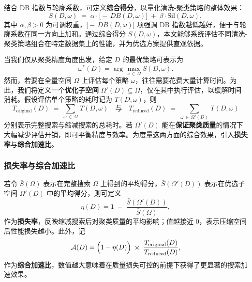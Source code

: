 \documentclass[10pt]{article} %
\numberwithin{equation}{section}
\begin{document}
结合 DB 指数与轮廓系数，可定义\textbf{综合得分}，以量化清洗-聚类策略的整体效果：
\begin{equation}\label{eq:S-score}
  S(D,\omega)
  \;=\;
  \alpha \cdot \bigl[-\,DB(D,\omega)\bigr]
  \;+\;
  \beta \cdot \mathrm{Sil}(D,\omega),
\end{equation}
其中 \(\alpha,\beta > 0\) 为可调权重，\(\bigl[-\,DB(D,\omega)\bigr]\) 项强调 DB 指数越低越好，便于与轮廓系数在同一方向上加和。通过综合得分 \(S(D,\omega)\)，本文能够系统评估不同清洗-聚类策略组合在特定数据集上的性能，并为优选方案提供直观依据。

当我们仅从聚类精度角度出发，给定 \(D\) 的最优策略可表示为
\begin{equation}\label{eq:best strategy}
  \omega^*(D)
  = \arg\max_{\omega \,\in\, \Omega} S(D,\omega).
\end{equation}
然而，若要在全量空间 \(\Omega\) 上评估每个策略 \(\omega\)，往往需要花费大量计算时间。为此，我们将定义一个\textbf{优化子空间} \(\Omega'(D)\subseteq \Omega\)，仅在其中执行评估，以缓解时间消耗。假设评估单个策略的耗时记为 \(T(D,\omega)\)，则
\begin{equation}\label{eq:T-original}
  T_{\text{original}}(D)
  \;=\;
  \sum_{\omega \,\in\, \Omega} \, T(D,\omega)
\quad\text{与}\quad
  T_{\text{reduced}}(D)
  \;=\;
  \sum_{\omega \,\in\, \Omega'(D)} \, T(D,\omega)
\end{equation}
分别表示完整搜索与缩减搜索的总耗时。若 \(\Omega'(D)\) 能在\textbf{保证聚类质量}的情况下大幅减少评估开销，即可平衡精度与效率。为度量这两方面的综合效果，引入\textbf{损失率}与\textbf{综合加速比}。

\subsubsection*{损失率与综合加速比}
若令 \(\bar{S}(\Omega)\) 表示在完整搜索 \(\Omega\) 上得到的平均得分，\(\bar{S}(\Omega'(D))\) 表示在优选子空间 \(\Omega'(D)\) 中的平均得分，则可定义
\begin{equation}\label{eq:loss-rate}
  \eta(D)
  =
  1 \;-\;
  \frac{\bar{S}(\Omega'(D))}{\bar{S}(\Omega)},
\end{equation}
作为\textbf{损失率}，反映缩减搜索后对聚类质量的平均影响；值越接近 0，表示压缩空间后性能损失越小。此外，记
\begin{equation}\label{eq:acc-ratio}
  \mathcal{A}(D)
  =
  \Bigl(1 - \eta(D)\Bigr)
  \;\times\;
  \frac{T_{\text{original}}(D)}{T_{\text{reduced}}(D)},
\end{equation}
作为\textbf{综合加速比}，数值越大意味着在质量损失可控的前提下获得了更显著的搜索加速效果。
\end{document}
